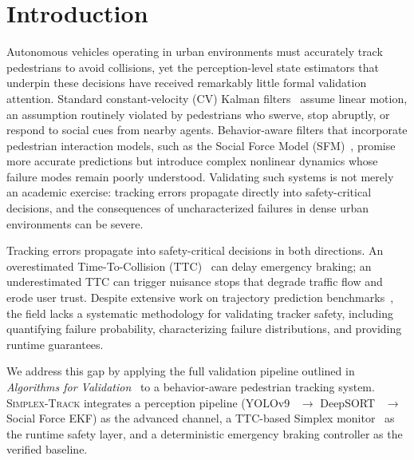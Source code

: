 \documentclass[conference]{IEEEtran}
\begin{document}
\section{Introduction}
\label{sec:intro}

Autonomous vehicles operating in urban environments must accurately track pedestrians to avoid collisions, yet the perception-level state estimators that underpin these decisions have received remarkably little formal validation attention. Standard constant-velocity (CV) Kalman filters~\cite{barshalom2001estimation} assume linear motion, an assumption routinely violated by pedestrians who swerve, stop abruptly, or respond to social cues from nearby agents. Behavior-aware filters that incorporate pedestrian interaction models, such as the Social Force Model (SFM)~\cite{helbing1995social}, promise more accurate predictions but introduce complex nonlinear dynamics whose failure modes remain poorly understood. Validating such systems is not merely an academic exercise: tracking errors propagate directly into safety-critical decisions, and the consequences of uncharacterized failures in dense urban environments can be severe.

Tracking errors propagate into safety-critical decisions in both directions. An overestimated Time-To-Collision (TTC)~\cite{minderhoud2001ttc} can delay emergency braking; an underestimated TTC can trigger nuisance stops that degrade traffic flow and erode user trust. Despite extensive work on trajectory prediction benchmarks~\cite{pellegrini2009youll, alahi2016social}, the field lacks a systematic methodology for validating tracker safety, including quantifying failure probability, characterizing failure distributions, and providing runtime guarantees.

We address this gap by applying the full validation pipeline outlined in \emph{Algorithms for Validation}~\cite{kochenderfer2025validation} to a behavior-aware pedestrian tracking system. \textsc{Simplex-Track} integrates a perception pipeline (YOLOv9~\cite{wang2024yolov9} $\to$ DeepSORT~\cite{wojke2017deepsort} $\to$ Social Force EKF) as the advanced channel, a TTC-based Simplex monitor~\cite{sha2001simplex, bak2014simplex} as the runtime safety layer, and a deterministic emergency braking controller as the verified baseline.
\end{document}
